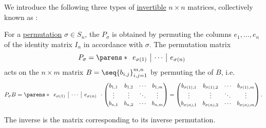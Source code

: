 \begin{definition}\label{def:elementary_matrix}
  We introduce the following three types of \hyperref[def:inverse_matrix]{invertible} \( n \times n \) matrices, collectively known as :
  \begin{thmenum}
     For a \hyperref[def:symmetric_group]{permutation} \( \sigma \in S_n \), the  \( P_\sigma \) is obtained by permuting the columns \( e_1, \ldots, e_n \) of the identity matrix \( I_n \) in accordance with \( \sigma \). The permutation matrix
    \begin{equation*}
      P_\sigma = \parens*
      {
        \begin{array}{c|c|c}
          e_{\sigma(1)} & \cdots & e_{\sigma(n)}
        \end{array}
      }
    \end{equation*}
    acts on the \( n \times m \) matrix \( B = \seq{ b_{i,j} }_{i,j=1}^{m,n} \) by permuting the  of \( B \), i.e.
    \begin{equation*}
      P_\sigma B
      =
      \parens*
      {
        \begin{array}{c|c|c}
          e_{\sigma(1)} & \cdots & e_{\sigma(n)}
        \end{array}
      }
      \cdot
      \begin{pmatrix}
        b_{1,1} & b_{1,2} & \cdots & b_{1,m} \\
        \vdots  & \vdots  & \ddots & \vdots \\
        b_{n,1} & b_{n,2} & \cdots & b_{n,m}
      \end{pmatrix}
      =
      \begin{pmatrix}
        b_{\sigma(1),1} & b_{\sigma(1),2} & \cdots & b_{\sigma(1),m} \\
        \vdots          & \vdots          & \ddots & \vdots \\
        b_{\sigma(n),1} & b_{\sigma(n),2} & \cdots & b_{\sigma(n),m}
      \end{pmatrix}.
    \end{equation*}

    The inverse is the matrix corresponding to its inverse permutation.


\end{thmenum}
\end{definition}
